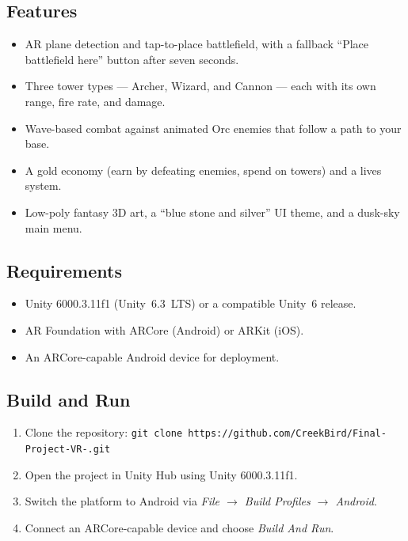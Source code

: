 \documentclass[11pt,a4paper]{article}
\begin{document}
\subsection*{Features}
\begin{itemize}[nosep]
  \item AR plane detection and tap-to-place battlefield, with a fallback ``Place battlefield here'' button after seven seconds.
  \item Three tower types --- Archer, Wizard, and Cannon --- each with its own range, fire rate, and damage.
  \item Wave-based combat against animated Orc enemies that follow a path to your base.
  \item A gold economy (earn by defeating enemies, spend on towers) and a lives system.
  \item Low-poly fantasy 3D art, a ``blue stone and silver'' UI theme, and a dusk-sky main menu.
\end{itemize}

\subsection*{Requirements}
\begin{itemize}[nosep]
  \item Unity 6000.3.11f1 (Unity~6.3~LTS) or a compatible Unity~6 release.
  \item AR Foundation with ARCore (Android) or ARKit (iOS).
  \item An ARCore-capable Android device for deployment.
\end{itemize}

\subsection*{Build and Run}
\begin{enumerate}[nosep]
  \item Clone the repository: \texttt{git clone https://github.com/CreekBird/Final-Project-VR-.git}
  \item Open the project in Unity Hub using Unity 6000.3.11f1.
  \item Switch the platform to Android via \emph{File $\rightarrow$ Build Profiles $\rightarrow$ Android}.
  \item Connect an ARCore-capable device and choose \emph{Build And Run}.
\end{enumerate}
\end{document}
